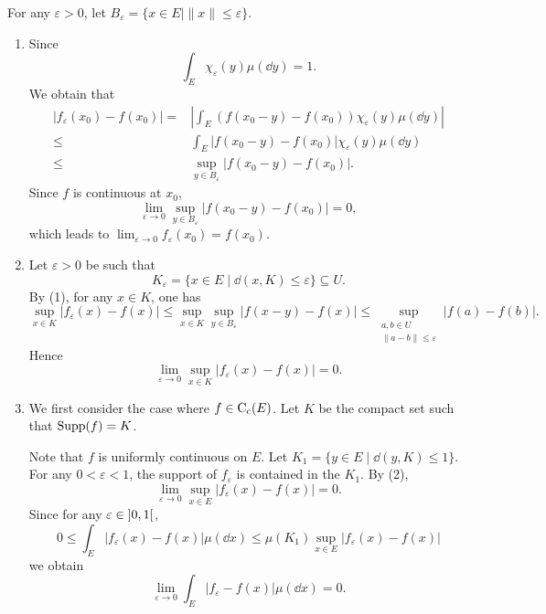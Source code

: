 \begin{proofenv}
    For any $\varepsilon > 0$, let $B_{\varepsilon} = \{x \in E \mid \|x\| \le \varepsilon\}$.
    \begin{enumerate}
        \item Since
            $$\int_E \chi_{\varepsilon}(y) \mu(\dd y) = 1.$$
            We obtain that
            $$\begin{aligned}
                |f_\varepsilon(x_0) - f(x_0)| = & \left|\int_E (f(x_0-y) - f(x_0))\chi_{\varepsilon}(y)\mu(\dd y)\right|\\
                \le & \int_E |f(x_0-y) - f(x_0)|\chi_{\varepsilon}(y)\mu(\dd y)\\
                \le & \sup_{y \in B_{\varepsilon}}|f(x_0 - y) - f(x_0)|.
            \end{aligned}$$
            Since $f$ is continuous at $x_0$, 
            $$\lim_{\varepsilon \to 0} \sup_{y \in B_{\varepsilon}}|f(x_0 - y) - f(x_0)| = 0,$$
            which leads to $\lim_{\varepsilon \to 0} f_\varepsilon(x_0) = f(x_0)$.
        \item Let $\varepsilon > 0$ be such that
            $$K_{\varepsilon} = \{x \in E \mid \dd(x,K) \le \varepsilon\} \subseteq U.$$
            By (1), for any $x \in K$, one has
            $$\sup_{x \in K} |f_{\varepsilon}(x) - f(x)| \le \sup_{x \in K} \sup_{y \in B_{\varepsilon}} |f(x-y) - f(x)| \le \sup_{\substack{a,b \in U\\ \|a-b\|\le \varepsilon}}|f(a) - f(b)|.$$
            Hence
            $$\lim_{\varepsilon \to 0} \sup_{x \in K}|f_{\varepsilon}(x) - f(x)| = 0.$$
        \item We first consider the case where $f \in \operatorname{C_{c}}(E)$.
            Let $K$ be the compact set such that $\operatorname{\mathrm{Supp}}(f) = K$.

            \quad Note that $f$ is uniformly continuous on $E$.
            Let $K_1 = \{y \in E \mid \dd(y,K) \le 1\}$.
            For any $0 < \varepsilon < 1$, the support of $f_{\varepsilon}$ is contained in the $K_1$.
            By (2),
            $$\lim_{\varepsilon \rightarrow 0} \sup_{x \in E} |f_{\varepsilon}(x) - f(x)| = 0.$$
            Since for any $\varepsilon \in \interval[open]{0}{1}$,
            $$0 \le \int_{E} |f_{\varepsilon}(x) - f(x)| \mu(\dd x) \le \mu(K_1) \sup_{x \in E}|f_{\varepsilon}(x) - f(x)|$$
            we obtain
            $$\lim_{\varepsilon \rightarrow 0} \int_{E} |f_{\varepsilon} - f(x)|\mu(\dd x) = 0.$$
            

\end{enumerate}
\end{proofenv}
